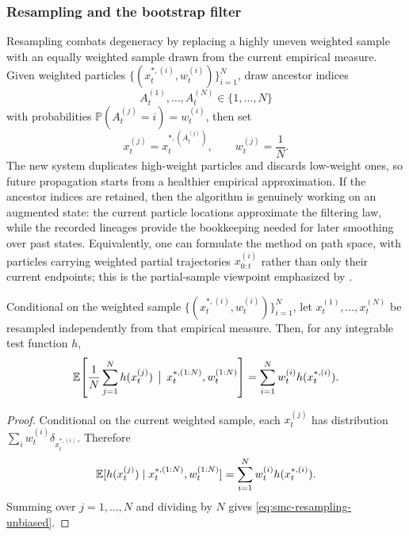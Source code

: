 \subsubsection{Resampling and the bootstrap filter}
\label{subsubsec:smc-resampling}

Resampling combats degeneracy by replacing a highly uneven weighted sample with an equally weighted sample drawn from the current empirical measure.
Given weighted particles $\{(x_t^{*,(i)},w_t^{(i)})\}_{i=1}^N$, draw ancestor indices
\[
  A_t^{(1)},\dots,A_t^{(N)} \in \{1,\dots,N\}
\]
with probabilities $\mathbb{P}(A_t^{(j)}=i)=w_t^{(i)}$, then set
\[
  x_t^{(j)} = x_t^{*,(A_t^{(j)})},
  \qquad
  w_t^{(j)} = \frac{1}{N}.
\]
The new system duplicates high-weight particles and discards low-weight ones, so future propagation starts from a healthier empirical approximation.
If the ancestor indices are retained, then the algorithm is genuinely working on an augmented state:
the current particle locations approximate the filtering law, while the recorded lineages provide the bookkeeping needed for later smoothing over past states.
Equivalently, one can formulate the method on path space, with particles carrying weighted partial trajectories $x_{0:t}^{(i)}$ rather than only their current endpoints; this is the partial-sample viewpoint emphasized by \citet[\S\S3.4.3--3.4.4]{liu_2002_monte_carlo}.

\begin{proposition}
\label{prop:smc-resampling}
Conditional on the weighted sample $\{(x_t^{*,(i)},w_t^{(i)})\}_{i=1}^N$, let $x_t^{(1)},\dots,x_t^{(N)}$ be resampled independently from that empirical measure.
Then, for any integrable test function $h$,
\begin{equation}
  \mathbb{E}\!\left[
    \frac{1}{N}\sum_{j=1}^N h(x_t^{(j)})
    \,\bigm|\,
    x_t^{*,(1:N)},w_t^{(1:N)}
  \right]
  =
  \sum_{i=1}^N w_t^{(i)} h(x_t^{*,(i)}).
  \label{eq:smc-resampling-unbiased}
\end{equation}
\end{proposition}
\begin{proof}
Conditional on the current weighted sample, each $x_t^{(j)}$ has distribution $\sum_i w_t^{(i)}\delta_{x_t^{*,(i)}}$.
Therefore
\[
  \mathbb{E}[h(x_t^{(j)}) \mid x_t^{*,(1:N)},w_t^{(1:N)}]
  =
  \sum_{i=1}^N w_t^{(i)} h(x_t^{*,(i)}).
\]
Summing over $j=1,\dots,N$ and dividing by $N$ gives \eqref{eq:smc-resampling-unbiased}.%
\end{proof}

